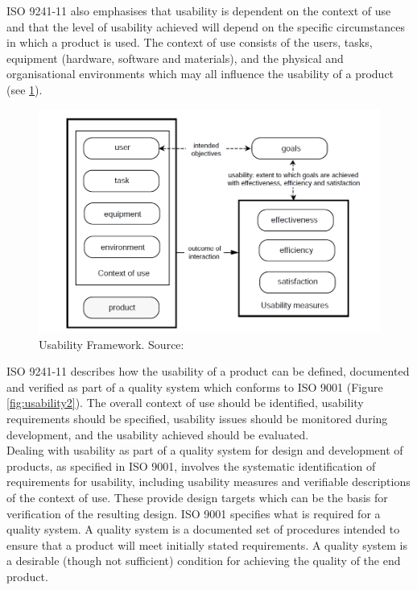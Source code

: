 ISO 9241-11 also emphasises that usability is dependent on the context of use and that the
level of usability achieved will depend on the specific circumstances in which a product is
used. The context of use consists of the users, tasks, equipment (hardware, software and
materials), and the physical and organisational environments which may all influence the
usability of a product (see \ref{fig:usability1}).

\begin{figure}[H]
\caption{Usability Framework. Source: \cite{bevan1995human}}
\label{fig:usability1}
\includegraphics[scale=0.2]{img/usability1.png}
\end{figure} 

ISO 9241-11 describes how the usability of a product can be defined, documented and
verified as part of a quality system which conforms to ISO 9001 (Figure \ref{fig:usability2}). The overall
context of use should be identified, usability requirements should be specified, usability issues
should be monitored during development, and the usability achieved should be evaluated. \\
Dealing with usability as part of a quality system for design and development of products,
as specified in ISO 9001, involves the systematic identification of requirements for usability,
including usability measures and verifiable descriptions of the context of use. These provide
design targets which can be the basis for verification of the resulting design.
ISO 9001 specifies what is required for a quality system. A quality system is a
documented set of procedures intended to ensure that a product will meet initially stated
requirements. A quality system is a desirable (though not sufficient) condition for achieving the 
quality of the end product. 

